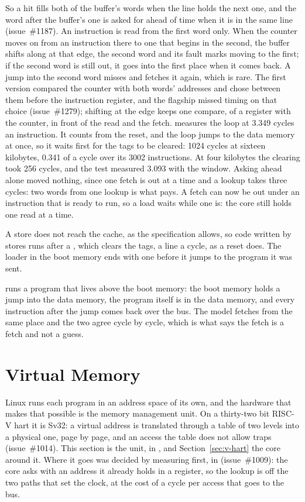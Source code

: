 \documentclass[journal,onecolumn,9pt]{IEEEtran}
\begin{document}
So a hit fills both of the buffer's words when the line holds the
next one, and the word after the buffer's one is asked for ahead of
time when it is in the same line (issue~\#1187). An instruction is
read from the first word only. When the counter moves on from an
instruction there to one that begins in the second, the buffer shifts
along at that edge, the second word and its fault marks moving to the
first; if the second word is still out, it goes into the first place
when it comes back. A jump into the second word misses and fetches it
again, which is rare. The first version compared the counter with
both words' addresses and chose between them before the instruction
register, and the flagship missed timing on that choice
(issue~\#1279); shifting at the edge keeps one compare, of a register
with the counter, in front of the read and the fetch.
 measures the loop at 3.349 cycles an
instruction. It counts from the reset, and the loop jumps to the data
memory at once, so it waits first for the tags to be cleared: 1024
cycles at sixteen kilobytes, 0.341 of a cycle over its 3002
instructions. At four kilobytes the clearing took 256 cycles, and the
test measured 3.093 with the window. Asking ahead alone moved
nothing, since one fetch is out at a time and a lookup takes three
cycles: two words from one lookup is what pays. A fetch can now be
out under an instruction that is ready to run, so a load waits while
one is: the core still holds one read at a time.

A store does not reach the cache, as the specification allows, so code
written by stores runs after a , which clears the tags,
a line a cycle, as a reset does. The loader in the boot memory ends
with one before it jumps to the program it was sent.

 runs a program that lives above the
boot memory: the boot memory holds a jump into the data memory, the
program itself is in the data memory, and every instruction after the
jump comes back over the bus. The model fetches from the same place
and the two agree cycle by cycle, which is what says the fetch is a
fetch and not a guess.

\section{Virtual Memory}
\label{sec:v-mmu}

Linux runs each program in an address space of its own, and the
hardware that makes that possible is the memory management unit. On a
thirty-two bit RISC-V hart it is Sv32: a virtual address is translated
through a table of two levels into a physical one, page by page, and
an access the table does not allow traps (issue~\#1014). This section
is the unit,  in , and
Section~\ref{sec:v-hart} the core around it. Where it goes was decided
by measuring first,
in  (issue~\#1009): the core asks with an
address it already holds in a register, so the lookup is off the two
paths that set the clock, at the cost of a cycle per access that goes
to the bus.
\end{document}
